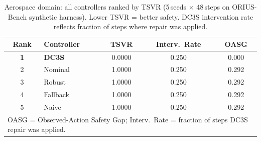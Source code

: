 \begin{table}[htbp]
\centering\small
\caption{Aerospace domain: all controllers ranked by TSVR (5\,seeds $\times$ 48\,steps on ORIUS-Bench synthetic harness). Lower TSVR = better safety. DC3S intervention rate reflects fraction of steps where repair was applied.}
\label{tab:aerospace_leaderboard}
\begin{tabular}{clccc}
\toprule
\textbf{Rank} & \textbf{Controller} & \textbf{TSVR} & \textbf{Interv.\ Rate} & \textbf{OASG} \\
\midrule
\textbf{1} & \textbf{DC3S} & 0.0000 & 0.250 & 0.000 \\
2 & Nominal & 1.0000 & 0.250 & 0.292 \\
3 & Robust & 1.0000 & 0.250 & 0.292 \\
4 & Fallback & 1.0000 & 0.250 & 0.292 \\
5 & Naive & 1.0000 & 0.250 & 0.292 \\
\bottomrule
\multicolumn{5}{l}{\small OASG = Observed-Action Safety Gap; Interv.\ Rate = fraction of steps DC3S repair was applied.}\\
\end{tabular}
\end{table}